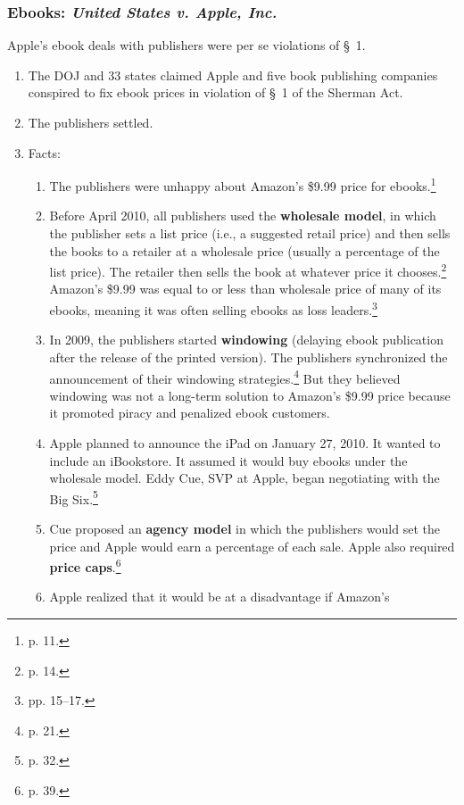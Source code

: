 \subsubsection{Ebooks: \emph{United States v. Apple, Inc.}}

Apple's ebook deals with publishers were per se violations of \S\ 1.

\begin{enumerate}
    \item The DOJ and 33 states claimed Apple and five book publishing 
    companies conspired to fix ebook prices in violation of \S\ 1 of the 
    Sherman Act.
    \item The publishers settled.
    \item Facts:
    \begin{enumerate}
        \item The publishers were unhappy about Amazon's \$9.99 price for 
        ebooks.\footnote{p. 11.}
        \item Before April 2010, all publishers used the \textbf{wholesale  
        model}, in which the publisher sets a list price (i.e., a suggested 
        retail price) and then sells the books to a retailer at a wholesale 
        price (usually a percentage of the list price). The retailer then sells 
        the book at whatever price it chooses.\footnote{p. 14.} Amazon's \$9.99 
        was equal to or less than wholesale price of many of its ebooks, meaning 
        it was often selling ebooks as loss leaders.\footnote{pp. 15--17.}
        \item In 2009, the publishers started \textbf{windowing} (delaying ebook 
        publication after the release of the printed version). The publishers 
        synchronized the announcement of their windowing strategies.\footnote{p. 
        21.} But they believed windowing was not a long-term solution to 
        Amazon's \$9.99 price because it promoted piracy and penalized ebook 
        customers.
        \item Apple planned to announce the iPad on January 27, 2010. It wanted 
        to include an iBookstore. It assumed it would buy ebooks under the 
        wholesale model. Eddy Cue, SVP at Apple, began negotiating with the Big 
        Six.\footnote{p. 32.}
        \item Cue proposed an \textbf{agency model} in which the publishers 
        would set the price and Apple would earn a percentage of each sale. 
        Apple also required \textbf{price caps}.\footnote{p. 39.}
        \item Apple realized that it would be at a disadvantage if Amazon's 

\end{enumerate}
\end{enumerate}
